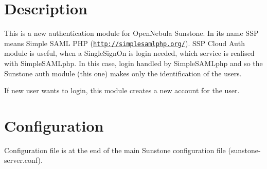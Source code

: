 \hypertarget{index_desc}{}\section{Description}\label{index_desc}
This is a new authentication module for OpenNebula Sunstone. In its name SSP means Simple \-S\-A\-M\-L PHP (\href{http://simplesamlphp.org/}{\tt http://simplesamlphp.org/}). SSP Cloud Auth module is useful, when a \-S\-i\-n\-g\-l\-e\-S\-i\-g\-n\-O\-n is login needed, which service is realised with \-S\-i\-m\-p\-l\-e\-S\-A\-M\-L\-p\-h\-p. In this case, login handled by \-S\-i\-m\-p\-l\-e\-S\-A\-M\-L\-p\-h\-p and so the Sunstone auth module (this one) makes only the identification of the users. \par
 If new user wants to login, this module creates a new account for the user.\hypertarget{index_conf}{}\section{Configuration}\label{index_conf}
Configuration file is at the end of the main Sunstone configuration file (\-s\-u\-n\-s\-t\-o\-n\-e-\/\-s\-e\-r\-v\-e\-r\-.\-c\-o\-n\-f). 